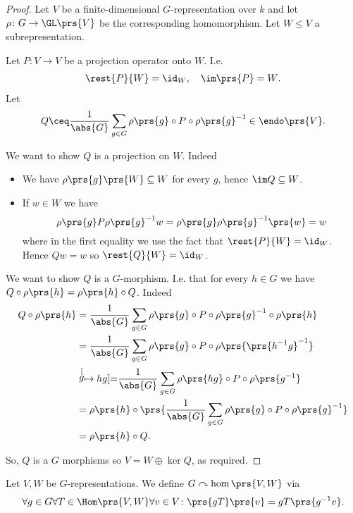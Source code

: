 \documentclass[10pt,a4paper,twoside,openany,hidelinks]{book}
\begin{document}
\begin{proof}
Let $V$ be a finite-dimensional $G$-representation over $k$ and let $\rho \colon G \to \GL\prs{V}$ be the corresponding homomorphism.
Let $W \leq V$ a subrepresentation.

Let $P \colon V \to V$ be a projection operator onto $W$.
I.e.
\begin{align*}
\rest{P}{W} = \id_W, \quad \im\prs{P} = W \text{.}
\end{align*}
Let
\begin{align*}
Q \ceq \frac{1}{\abs{G}} \sum_{g \in G} \rho\prs{g} \circ P \circ \rho\prs{g}^{-1} \in \endo\prs{V} \text{.}
\end{align*}

We want to show $Q$ is a projection on $W$.
Indeed
\begin{itemize}
\item
We have $\rho\prs{g}\prs{W} \subseteq W$ for every $g$, hence $\im Q \subseteq W$.
\item
If $w \in W$ we have
\[\rho\prs{g} P \rho\prs{g}^{-1} w = \rho\prs{g} \rho\prs{g}^{-1} \prs{w} = w\]
where in the first equality we use the fact that $\rest{P}{W} = \id_W$.
Hence $Q w = w$ so $\rest{Q}{W} = \id_W$.
\end{itemize}

We want to show $Q$ is a $G$-morphism.
I.e. that for every $h \in G$ we have $Q \circ \rho\prs{h} = \rho\prs{h} \circ Q$.
Indeed
\begin{align*}
Q \circ \rho\prs{h} &= \frac{1}{\abs{G}} \sum_{g \in G} \rho\prs{g} \circ P \circ \rho\prs{g}^{-1} \circ \rho\prs{h} \\&=
\frac{1}{\abs{G}} \sum_{g \in G} \rho\prs{g} \circ P \circ \rho\prs{\prs{h^{-1} g}^{-1}}
\\&\stackrel[g \mapsto hg]{}{=}
\frac{1}{\abs{G}} \sum_{g \in G} \rho\prs{hg} \circ P \circ \rho\prs{g^{-1}}
\\&=
\rho\prs{h} \circ \prs{\frac{1}{\abs{G}} \sum_{g \in G} \rho\prs{g} \circ P \circ \rho\prs{g}^{-1}}
\\&=
\rho\prs{h} \circ Q \text{.}
\end{align*}

So, $Q$ is a $G$ morphisms so $V = W \oplus \ker Q$, as required.
\end{proof}

\begin{definition}
Let $V,W$ be $G$-representations. We define $G \acts \hom\prs{V,W}$ via
\[\forall g \in G \forall T \in \Hom\prs{V,W} \forall v \in V \colon \prs{gT}\prs{v} = g T \prs{g^{-1} v} \text{.}\]
\end{definition}
\end{document}
